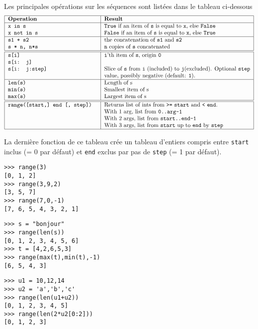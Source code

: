 \noindent Les principales opérations sur les séquences sont listées 
dans le tableau ci-dessous
$$\begin{tabular}{|l|p{9cm}|}
\hline 
\makebox[5.5cm][l]{\bf Operation} &	\bf Result 	\\
\hline
\tt x in s      & {\tt True} if an item of {\tt s} is equal to {\tt x}, else {\tt False} \\ 	
\tt x not in s 	& {\tt False} if an item of {\tt s} is equal to {\tt x}, else {\tt True}\\
\hline 	
\tt s1 + s2 	& the concatenation of {\tt s1} and {\tt s2}\\ 	 
\tt s * n, n*s 	& {\tt n} copies of {\tt s} concatenated \\	
\hline
\hline
\tt s[i] 	& {\tt i}'th item of {\tt s}, origin {\tt 0}\\ 	
\tt s[i: j]     & \\
\tt s[i: j:step]& Slice of {\tt s} from {\tt i} (included) to {\tt j}(excluded). 
                  Optional {\tt step} value, possibly negative (default: {\tt 1}). \\	
\hline
\tt len(s) 	& Length of s \\	 
\tt min(s) 	& Smallest item of s \\	
\tt max(s) 	& Largest item of s \\
\hline
\hline
\tt range([start,] end [, step]) & Returns list of ints from {\tt >=} {\tt start} and {\tt <} {\tt end}.\newline
	With 1 arg, list from {\tt 0..arg-1}\newline
	With 2 args, list from {\tt start..end-1}\newline
	With 3 args, list from {\tt start} up to {\tt end} by {\tt step}\\
\hline
\end{tabular}$$

La dernière fonction de ce tableau crée un tableau d'entiers compris entre {\tt start} inclus
(= 0 par défaut) et {\tt end} exclus par pas de {\tt step} (= 1 par défaut).

\begin{minipage}[t]{5cm}
\begin{Verbatim}
>>> range(3)
[0, 1, 2]
>>> range(3,9,2)
[3, 5, 7]
>>> range(7,0,-1)
[7, 6, 5, 4, 3, 2, 1]
\end{Verbatim}
\end{minipage}
\hfill
\begin{minipage}[t]{5cm}
\begin{Verbatim}
>>> s = "bonjour"
>>> range(len(s))
[0, 1, 2, 3, 4, 5, 6]
>>> t = [4,2,6,5,3]
>>> range(max(t),min(t),-1)
[6, 5, 4, 3]
\end{Verbatim}
\end{minipage}
\hfill
\begin{minipage}[t]{5cm}
\begin{Verbatim}
>>> u1 = 10,12,14
>>> u2 = 'a','b','c'
>>> range(len(u1+u2))
[0, 1, 2, 3, 4, 5]
>>> range(len(2*u2[0:2]))
[0, 1, 2, 3]
\end{Verbatim}
\end{minipage}
\vspace*{1mm}

